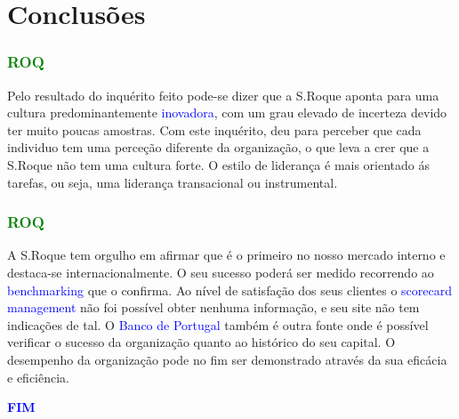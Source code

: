 \section{Conclusões}
\begin{frame}
\frametitle{\textcolor{green}{ROQ}}
Pelo resultado do inquérito feito pode-se dizer que a S.Roque aponta para uma cultura predominantemente \textcolor{blue}{inovadora}, com um grau elevado de incerteza devido ter muito poucas amostras. Com este inquérito, deu para perceber que cada individuo tem uma perceção diferente da organização, o que leva a crer que a S.Roque não tem uma cultura forte. O estilo de liderança é mais orientado ás tarefas, ou seja, uma liderança transacional ou instrumental.
\end{frame}
\begin{frame}
\frametitle{\textcolor{green}{ROQ}}
A S.Roque tem orgulho em afirmar que é o primeiro no nosso mercado interno e destaca-se internacionalmente. O seu sucesso poderá ser medido recorrendo ao \textcolor{blue}{benchmarking} que o confirma. Ao nível de satisfação dos seus clientes o \textcolor{blue}{scorecard management} não foi possível obter nenhuma informação, e seu site não tem indicações de tal. O \textcolor{blue}{Banco de Portugal} também é outra fonte onde é possível verificar o sucesso da organização quanto ao histórico do seu capital. O desempenho da organização pode no fim ser demonstrado através da sua eficácia e eficiência.\\
\end{frame}
\begin{frame}
\centering
\Huge \textcolor{blue}{\textbf{FIM}}
\end{frame}

